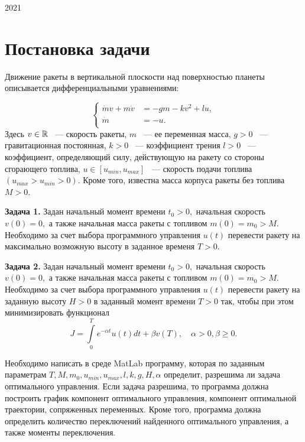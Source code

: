 \documentclass[10pt,pdf,hyperref={unicode}]{beamer}
\begin{document}
		\begin{center}
		  2021
		\end{center}
		
		\newpage
	
	\tableofcontents
	
	\newpage
	\section{Постановка задачи}
	Движение ракеты в вертикальной плоскости над поверхностью планеты описывается дифференциальными уравнениями:
	
	\begin{equation}\label{rawSystem}
	\left\{
		\begin{aligned}
		\dot m v + m \dot v &= -gm - kv^2 + lu, \\
		\dot m &= -u.\\
		\end{aligned}
	\right.
	\end{equation}
	Здесь \(v \in \mathbb{R} \) ~--- скорость ракеты, \(m \) ~--- ее переменная масса, \(g > 0\) ~--- гравитационная постоянная,
	\(k > 0\) ~--- коэффициент трения \(l > 0\) ~--- коэффициент, определяющий силу, действующую на ракету со стороны
	сгорающего топлива, \(u \in \left[u_{min}, u_{max}  \right]\) ~--- скорость подачи топлива \(\left(u_{max} > u_{min} > 0 \right)  .\)
	Кроме того, известна масса корпуса ракеты без топлива \(M > 0.\)
	
	\textbf{Задача 1.} Задан начальный момент времени \(t_0 > 0, \) начальная скорость
	\(v(0) = 0, \) а также начальная масса ракеты с топливом \(m(0) = m_0 > M.\) Необходимо за счет выбора программного
	управления \(u(t)\) перевести ракету на максимально возможную высоту в заданное временя \(T > 0.\)
	
	\textbf{Задача 2.} Задан начальный момент времени \(t_0 > 0, \) начальная скорость
	\(v(0) = 0, \) а также начальная масса ракеты с топливом \(m(0) = m_0 > M.\) Необходимо за счет выбора программного
	управления \(u(t)\) перевести ракету на заданную высоту \(H > 0\) в заданный момент времени
	\(T > 0\) так, чтобы при этом минимизировать функционал 
	\[
	J = \int \limits ^T_0 e^{-\alpha t} u(t)dt + \beta v(T), \quad \alpha > 0, \beta \ge 0.
	\]
	
	
	Необходимо написать в среде MatLab программу, которая по заданным параметрам
	\(T, M, m_0, u_{min}, u_{max}, l, k, g, H, \alpha\) определит, разрешима ли задача
	оптимального управления. Если задача разрешима, то программа должна построить график
	компонент оптимального управления, компонент оптимальной траектории, сопряженных
	переменных. Кроме того, программа должна определить количество переключений найденного оптимального управления, 
	а также моменты переключения.
	
\end{document}
